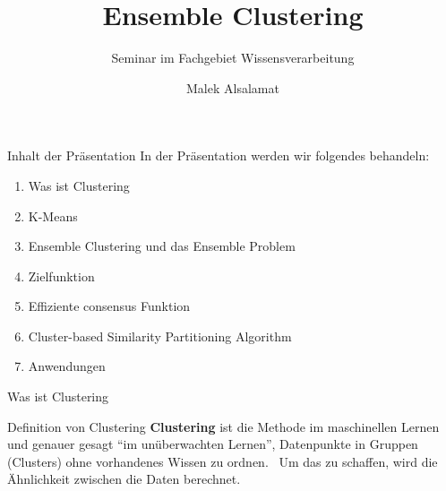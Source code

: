 \documentclass{beamer}
\title{Ensemble Clustering}
\subtitle{Seminar im Fachgebiet Wissensverarbeitung}
\author{Malek Alsalamat}
\institute{Universität Kassel}
\begin{document}
	
\begin{frame}
	\titlepage
\end{frame}

\begin{frame}{Inhalt der Präsentation}
	In der Präsentation werden wir folgendes behandeln: 
	\begin{enumerate}
		\item Was ist Clustering
		\item K-Means 
		\item Ensemble Clustering und das Ensemble Problem
		\item Zielfunktion
		\item Effiziente consensus Funktion
		\item Cluster-based Similarity Partitioning Algorithm
		\item Anwendungen
	\end{enumerate}
\end{frame}

\begin{frame}{Was ist Clustering}
	\begin{block}{Definition von Clustering}
		\textbf{Clustering} ist die Methode im maschinellen Lernen und genauer gesagt “im unüberwachten Lernen”, Datenpunkte in Gruppen (Clusters) ohne vorhandenes Wissen zu ordnen.  Um das zu schaffen, wird die Ähnlichkeit zwischen die Daten berechnet.
	\end{block}
\end{frame}
\end{document}
